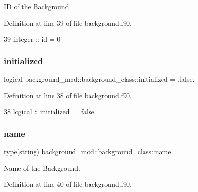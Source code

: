 ID of the Background. 



Definition at line 39 of file background.\+f90.


\begin{DoxyCode}
39         \textcolor{keywordtype}{integer} :: id = 0
\end{DoxyCode}
\mbox{\label{structbackground__mod_1_1background__class_aeb3f1a195165888bc63066aed03d651b}} 
\subsubsection{\texorpdfstring{initialized}{initialized}}
{\footnotesize\ttfamily logical background\+\_\+mod\+::background\+\_\+class\+::initialized = .false.\hspace{0.3cm}{\ttfamily [private]}}



Definition at line 38 of file background.\+f90.


\begin{DoxyCode}
38         \textcolor{keywordtype}{logical} :: initialized = .false.
\end{DoxyCode}
\mbox{\label{structbackground__mod_1_1background__class_a4f812fd2adfe5d1e50db63e75e460022}} 
\subsubsection{\texorpdfstring{name}{name}}
{\footnotesize\ttfamily type(string) background\+\_\+mod\+::background\+\_\+class\+::name\hspace{0.3cm}{\ttfamily [private]}}



Name of the Background. 



Definition at line 40 of file background.\+f90.


